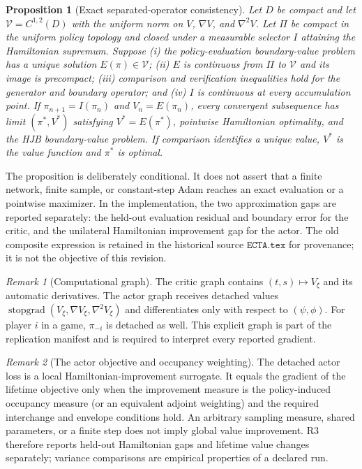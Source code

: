 \documentclass[ecta]{econsocart}
\theoremstyle{plain}
\newtheorem{proposition}{Proposition}
\theoremstyle{remark}
\newtheorem{remark}{Remark}
\begin{document}
\begin{proposition}[Exact separated-operator consistency]
\label{prop:r2_consistency}
Let $D$ be compact and let $\mathcal V=C^{1,2}(D)$ with the uniform norm on $V$, $\nabla V$, and $\nabla^2V$. Let $\Pi$ be compact in the uniform policy topology and closed under a measurable selector $I$ attaining the Hamiltonian supremum. Suppose (i) the policy-evaluation boundary-value problem has a unique solution $E(\pi)\in\mathcal V$; (ii) $E$ is continuous from $\Pi$ to $\mathcal V$ and its image is precompact; (iii) comparison and verification inequalities hold for the generator and boundary operator; and (iv) $I$ is continuous at every accumulation point. If $\pi_{n+1}=I(\pi_n)$ and $V_n=E(\pi_n)$, every convergent subsequence has limit $(\pi^*,V^*)$ satisfying $V^*=E(\pi^*)$, pointwise Hamiltonian optimality, and the HJB boundary-value problem. If comparison identifies a unique value, $V^*$ is the value function and $\pi^*$ is optimal.
\end{proposition}

The proposition is deliberately conditional. It does not assert that a finite network, finite sample, or constant-step Adam reaches an exact evaluation or a pointwise maximizer. In the implementation, the two approximation gaps are reported separately: the held-out evaluation residual and boundary error for the critic, and the unilateral Hamiltonian improvement gap for the actor. The old composite expression is retained in the historical source $\texttt{ECTA.tex}$ for provenance; it is not the objective of this revision.

\begin{remark}[Computational graph]
The critic graph contains $(t,s)\mapsto V_\xi$ and its automatic derivatives. The actor graph receives detached values $\operatorname{stopgrad}(V_\xi,\nabla V_\xi,\nabla^2V_\xi)$ and differentiates only with respect to $(\psi,\phi)$. For player $i$ in a game, $\pi_{-i}$ is detached as well. This explicit graph is part of the replication manifest and is required to interpret every reported gradient.
\end{remark}

\begin{remark}[The actor objective and occupancy weighting]
\label{rem:actor_objective}
The detached actor loss is a local Hamiltonian-improvement surrogate. It equals the gradient of the lifetime objective only when the improvement measure is the policy-induced occupancy measure (or an equivalent adjoint weighting) and the required interchange and envelope conditions hold. An arbitrary sampling measure, shared parameters, or a finite step does not imply global value improvement. R3 therefore reports held-out Hamiltonian gaps and lifetime value changes separately; variance comparisons are empirical properties of a declared run.
\end{remark}
\end{document}
